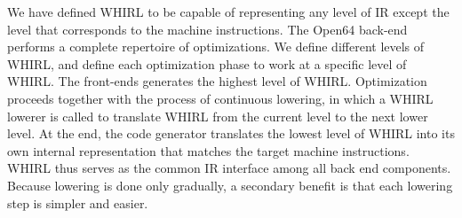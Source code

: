 We have defined WHIRL to be
capable of representing any level of IR except the level that
corresponds to the machine instructions. The Open64 back-end
performs a complete repertoire of optimizations. We define different
levels of WHIRL, and define each optimization phase to work at a
specific level of WHIRL. The front-ends generates the highest level
of WHIRL. Optimization proceeds together with the process of
continuous lowering, in which a WHIRL lowerer is called to translate WHIRL from the current level to the next lower level. At the end, the code generator
translates the lowest level of WHIRL into its own internal representation that
matches the target machine instructions. WHIRL thus serves as the common IR interface among all back end components. Because lowering is done only gradually, 
a secondary benefit is that each lowering step is simpler and easier.

